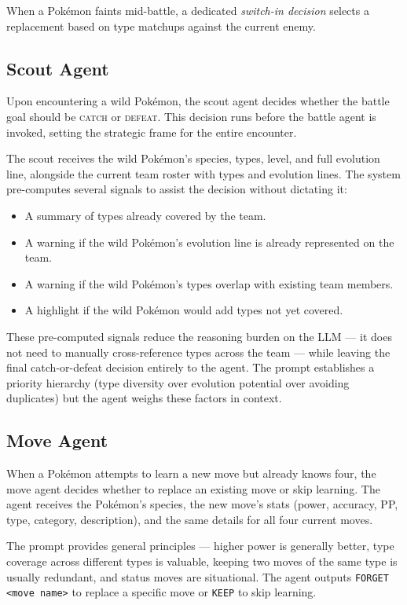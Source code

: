 \documentclass{article}
\begin{document}
When a Pok\'{e}mon faints mid-battle, a dedicated \emph{switch-in decision} selects a replacement based on type matchups against the current enemy.
\subsection{Scout Agent}

Upon encountering a wild Pok\'{e}mon, the scout agent decides whether the battle goal should be \textsc{catch} or \textsc{defeat}. This decision runs before the battle agent is invoked, setting the strategic frame for the entire encounter.

The scout receives the wild Pok\'{e}mon's species, types, level, and full evolution line, alongside the current team roster with types and evolution lines. The system pre-computes several signals to assist the decision without dictating it:

\begin{itemize}
  \item A summary of types already covered by the team.
  \item A warning if the wild Pok\'{e}mon's evolution line is already represented on the team.
  \item A warning if the wild Pok\'{e}mon's types overlap with existing team members.
  \item A highlight if the wild Pok\'{e}mon would add types not yet covered.
\end{itemize}

These pre-computed signals reduce the reasoning burden on the LLM --- it does not need to manually cross-reference types across the team --- while leaving the final catch-or-defeat decision entirely to the agent. The prompt establishes a priority hierarchy (type diversity over evolution potential over avoiding duplicates) but the agent weighs these factors in context.

\subsection{Move Agent}

When a Pok\'{e}mon attempts to learn a new move but already knows four, the move agent decides whether to replace an existing move or skip learning. The agent receives the Pok\'{e}mon's species, the new move's stats (power, accuracy, PP, type, category, description), and the same details for all four current moves.

The prompt provides general principles --- higher power is generally better, type coverage across different types is valuable, keeping two moves of the same type is usually redundant, and status moves are situational. The agent outputs \texttt{FORGET <move name>} to replace a specific move or \texttt{KEEP} to skip learning.
\end{document}
